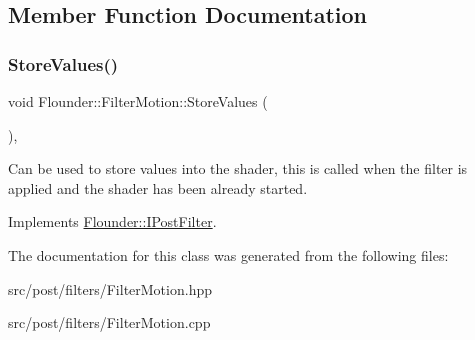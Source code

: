 \subsection{Member Function Documentation}
\mbox{\label{class_flounder_1_1_filter_motion_ab3260386a2a7ffc8a3aaa61ab910df82}} 
\subsubsection{\texorpdfstring{Store\+Values()}{StoreValues()}}
{\footnotesize\ttfamily void Flounder\+::\+Filter\+Motion\+::\+Store\+Values (\begin{DoxyParamCaption}{ }\end{DoxyParamCaption})\hspace{0.3cm}{\ttfamily [override]}, {\ttfamily [virtual]}}



Can be used to store values into the shader, this is called when the filter is applied and the shader has been already started. 



Implements \hyperlink{class_flounder_1_1_i_post_filter_a20420ec0a9bac67437740552bea9ab74}{Flounder\+::\+I\+Post\+Filter}.



The documentation for this class was generated from the following files\+:\begin{DoxyCompactItemize}
\item 
src/post/filters/Filter\+Motion.\+hpp\item 
src/post/filters/Filter\+Motion.\+cpp\end{DoxyCompactItemize}
